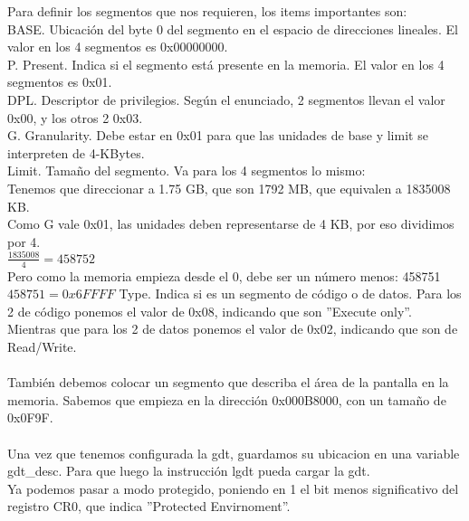 Para definir los segmentos que nos requieren, los items importantes son:\\
BASE. Ubicaci\'on del byte 0 del segmento en el espacio de direcciones lineales. El valor en los 4 segmentos es 0x00000000.\\
P. Present. Indica si el segmento est\'a presente en la memoria. El valor en los 4 segmentos es 0x01.\\
DPL. Descriptor de privilegios. Seg\'un el enunciado, 2 segmentos llevan el valor 0x00, y los otros 2 0x03.\\
G. Granularity. Debe estar en 0x01 para que las unidades de base y limit se interpreten de 4-KBytes.\\
Limit. Tamaño del segmento. Va para los 4 segmentos lo mismo:\\
\indent Tenemos que direccionar a 1.75 GB, que son 1792 MB, que equivalen a 1835008 KB.\\
\indent Como G vale 0x01, las unidades deben representarse de 4 KB, por eso dividimos por 4.\\
\indent $\frac{1835008}{4} = 458752$\\
\indent Pero como la memoria empieza desde el 0, debe ser un n\'umero menos: 458751\\
\indent $458751 = 0x6FFFF$
Type. Indica si es un segmento de c\'odigo o de datos. Para los 2 de c\'odigo ponemos el valor de 0x08, indicando que son ''Execute only''. Mientras que para los 2 de datos ponemos el valor de 0x02, indicando que son de Read/Write.\\\\

Tambi\'en debemos colocar un segmento que describa el \'area de la pantalla en la memoria. Sabemos que empieza en la direcci\'on 0x000B8000, con un tamaño de 0x0F9F.\\\\

Una vez que tenemos configurada la gdt, guardamos su ubicacion en una variable gdt\_desc. Para que luego la instrucci\'on lgdt pueda cargar la gdt.\\
Ya podemos pasar a modo protegido, poniendo en 1 el bit menos significativo del registro CR0, que indica ''Protected Envirnoment''.
 

 